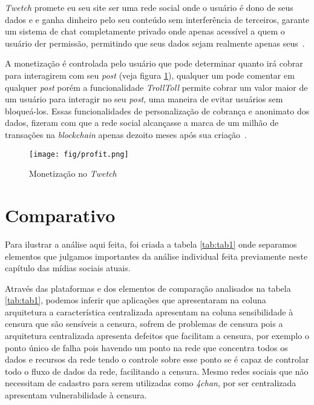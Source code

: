 \textit{Twetch} promete eu seu site ser uma rede social onde o usuário é dono de seus dados e e ganha dinheiro pelo seu conteúdo sem interferência de terceiros, garante um sistema de chat completamente privado onde apenas acessível a quem o usuário der permissão, permitindo que seus dados sejam realmente apenas seus~\cite{Twetch1}.

A monetização é controlada pelo usuário que pode determinar quanto irá cobrar para interagirem com seu \textit{post} (veja figura \ref{fig:twetch-profit}), qualquer um pode comentar em qualquer \textit{post} porém a funcionalidade \textit{TrollToll} permite cobrar um valor maior de um usuário para interagir no seu \textit{post}, uma maneira de evitar usuários sem bloqueá-los. Essas funcionalidades de personalização de cobrança e anonimato dos dados, fizeram com que a rede social alcançasse a marca de um milhão de transações na \textit{blockchain} apenas dezoito meses após sua criação~\cite{Twetch2}. 

\begin{figure}[htb!]
\centering\texttt{[image: fig/profit.png]}
\caption%
        {\label{fig:twetch-profit}Monetização no \textit{Twetch}~\cite{Twetch1}}
\end{figure}

\section{Comparativo}

Para ilustrar a análise aqui feita, foi criada a tabela \ref{tab:tab1} onde separamos elementos que julgamos importantes da análise individual feita previamente neste capítulo das mídias sociais atuais.

Através das plataformas e dos elementos de comparação analisados na tabela \ref{tab:tab1}, podemos inferir que aplicações que apresentaram na coluna arquitetura a característica centralizada  apresentam na coluna sensibilidade à censura que são sensíveis a  censura, sofrem de problemas de censura pois a arquitetura centralizada apresenta defeitos que facilitam a censura, por exemplo o ponto único de falha pois havendo um ponto na rede que concentra todos os dados e recursos da rede tendo o controle sobre esse ponto se é capaz de controlar todo o fluxo de dados da rede, facilitando a censura. Mesmo redes sociais que não necessitam de cadastro para serem utilizadas como \textit{4chan}, por ser centralizada apresentam vulnerabilidade à censura. 


